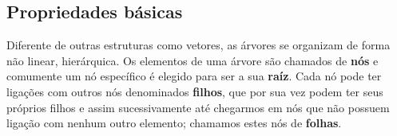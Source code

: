 \subsection{Propriedades básicas}

Diferente de outras estruturas como vetores, as árvores se organizam de forma
não linear, hierárquica. Os elementos de uma árvore são chamados de \textbf{nós} e
comumente um nó específico é elegido para ser a sua \textbf{raíz}. Cada nó pode
ter ligações com outros nós denominados \textbf{filhos}, que por sua vez podem
ter seus próprios filhos e assim sucessivamente até chegarmos em nós que não
possuem ligação com nenhum outro elemento; chamamos estes nós de \textbf{folhas}.

